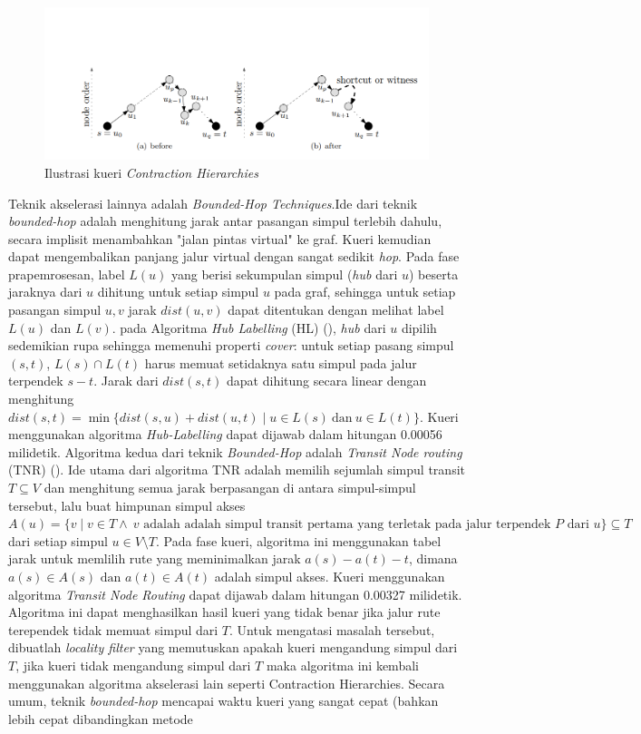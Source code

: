 \begin{figure}[H]
    \centering
    \includegraphics[width=\linewidth, keepaspectratio]{figures/CH.png}
    \caption{Ilustrasi kueri \textit{Contraction Hierarchies}}
    \label{fig:query-ch}
\end{figure}


Teknik akselerasi lainnya adalah \textit{Bounded-Hop Techniques}.Ide dari teknik \textit{bounded-hop} adalah menghitung jarak antar pasangan simpul terlebih dahulu, secara implisit menambahkan "jalan pintas virtual" ke graf. Kueri kemudian dapat mengembalikan panjang jalur virtual dengan sangat sedikit \textit{hop}. Pada fase prapemrosesan, label $L(u)$ yang berisi sekumpulan simpul (\textit{hub} dari $u$) beserta jaraknya dari $u$ dihitung untuk setiap simpul $u$ pada graf, sehingga untuk setiap pasangan simpul $u,v$ jarak $dist(u,v)$ dapat ditentukan dengan melihat label $L(u)$ dan $L(v)$. pada Algoritma \textit{Hub Labelling} (HL) (\cite{Abraham2011}), \textit{hub} dari $u$ dipilih sedemikian rupa sehingga memenuhi properti \textit{cover}: untuk setiap pasang simpul $(s,t)$, $L(s)\cap L(t)$ harus memuat setidaknya satu simpul pada jalur terpendek $s-t$. Jarak dari $dist(s,t)$ dapat dihitung secara linear dengan menghitung $dist(s,t) = \min \{ dist(s,u) + dist(u,t) \mid u \in L(s) \ \text{dan} \ u \in L(t) \}$. Kueri menggunakan algoritma \textit{Hub-Labelling} dapat dijawab dalam hitungan 0.00056 milidetik. Algoritma kedua dari teknik \textit{Bounded-Hop} adalah \textit{Transit Node routing} (TNR) (\cite{Arz2013}). Ide utama dari algoritma TNR adalah memilih sejumlah simpul transit $T\subseteq V$ dan menghitung semua jarak berpasangan di antara simpul-simpul tersebut, lalu buat himpunan simpul akses $A(u)=\{v \mid v\in T \land \  v \text{ adalah adalah simpul transit pertama yang terletak pada jalur terpendek } P \text{ dari } u  \}  \subseteq T$ dari setiap simpul $u \in V \setminus T$. Pada fase kueri, algoritma ini menggunakan tabel jarak untuk memlilih rute yang meminimalkan jarak $a(s)-a(t)-t$, dimana $a(s)\in A(s) \text{ dan } a(t) \in A(t)$ adalah simpul akses. Kueri menggunakan algoritma \textit{Transit Node Routing} dapat dijawab dalam hitungan 0.00327 milidetik. Algoritma ini dapat menghasilkan hasil kueri yang tidak benar jika jalur rute terependek tidak memuat simpul dari $T$. Untuk mengatasi masalah tersebut, dibuatlah \textit{locality filter} yang memutuskan apakah kueri mengandung simpul dari $T$, jika kueri tidak mengandung simpul dari $T$ maka algoritma ini kembali menggunakan algoritma akselerasi lain seperti Contraction Hierarchies. Secara umum, teknik \textit{bounded-hop} mencapai waktu kueri yang sangat cepat (bahkan lebih cepat dibandingkan metode 